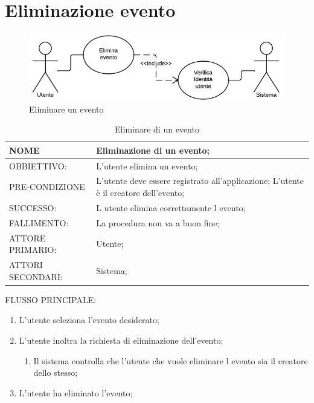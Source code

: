 \section{Eliminazione evento}
\begin{figure}[H]
\centering
\includegraphics[scale=0.60]{img/use/Elimina.png}
\caption{Eliminare un evento}
\label{fig:Elimina}
\end{figure}
\begin{table}[H]
\begin{tabular}{p{}|p{}}
\toprule
NOME & Eliminazione di un evento;\\
\hline
OBBIETTIVO: & L'utente elimina un evento;\\
\hline
PRE-CONDIZIONE & L'utente deve essere registrato all'applicazione;
L'utente è il creatore dell'evento;\\
\hline
SUCCESSO: & L utente elimina correttamente l evento;\\
\hline
FALLIMENTO: & La procedura non va a buon fine;\\
\hline
ATTORE PRIMARIO: & Utente;\\
\hline
ATTORI SECONDARI: & Sistema;\\
\bottomrule
\end{tabular}
\caption{Eliminare di un evento}
\label{table:elimina}
\end{table}	
FLUSSO PRINCIPALE:
\begin{enumerate}
\item L'utente seleziona l'evento desiderato;
\item L'utente inoltra la richiesta di eliminazione dell'evento;
\begin{enumerate}
\item Il sistema controlla che l'utente che vuole eliminare l evento sia il creatore dello stesso;
\end{enumerate}
\item L'utente ha eliminato l'evento;
\end{enumerate}

